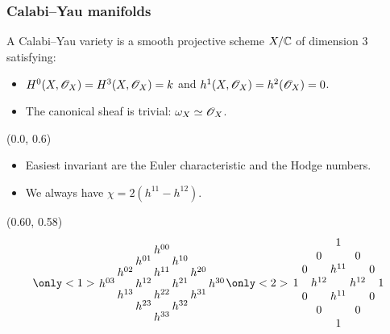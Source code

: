 \documentclass[UKenglish]{beamer}
\begin{document}
\begin{frame}
\frametitle{Calabi--Yau manifolds}

\begin{definition}
A Calabi--Yau variety is a smooth projective scheme $X/\mathbb C$ of dimension $3$ satisfying:
\begin{itemize}
	\item $H^0(X,\mathscr{O}_X)=H^3(X,\mathscr{O}_X)=k$ and $h^1(X,\mathscr{O}_X)=h^2(\mathscr{O}_X)=0$.
	\item The canonical sheaf is trivial: $\omega_X \simeq \mathscr{O}_X$. 
\end{itemize}
\end{definition}

\begin{textblock}{0.5}(0.0, 0.6)
\begin{itemize}
	\item Easiest invariant are the Euler characteristic and the Hodge numbers.

	\item We always have $\chi = 2(h^{11}-h^{12})$. 
\end{itemize}
\end{textblock}

    \begin{textblock}{0.4}(0.60, 0.58)
    \[
    \only<1>{
   \arraycolsep=1pt\def\arraystretch{0.5}
\begin{array}[c]{ccccccc}
&&&               h^{00} \\  
 &         & h^{01} & & h^{10}  \\
&	h^{02} && h^{11}  && h^{20}  \\
   h^{03} && h^{12} && h^{21} && h^{30} \\
&	h^{13} && h^{22}  && h^{31}  \\
 &         & h^{23} & & h^{32}  \\
                &&& h^{33} 
\end{array}
}
\only<2>{
\arraycolsep=1.5pt\def\arraystretch{1}
\begin{array}[c]{ccccccc}
&&& 1 \\  
 &         & 0 & & 0  \\
&	0 && h^{11}  && 0  \\
1 && h^{12} && h^{12} && 1 \\
&	0 && h^{11}  && 0  \\
 &         & 0 & & 0  \\
 &&& 1 
\end{array}
}
\]

    \end{textblock}

\end{frame}
\end{document}
